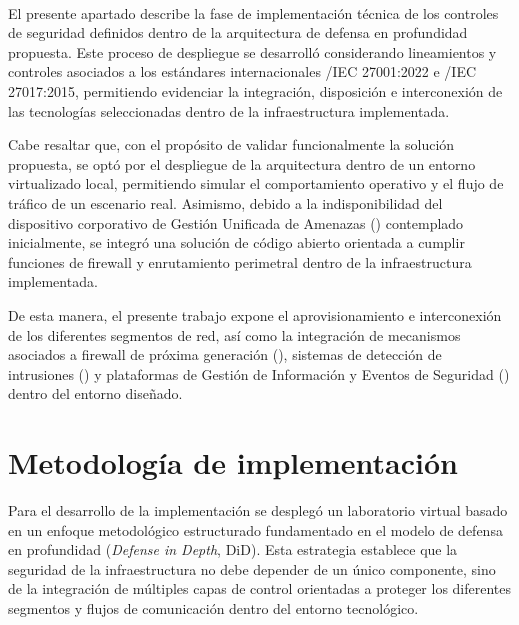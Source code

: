 \label{cap:pmv}
\mbox{}\\

El presente apartado describe la fase de implementación técnica de los controles de seguridad definidos dentro de la arquitectura de 
defensa en profundidad propuesta. Este proceso de despliegue se desarrolló considerando lineamientos y controles asociados a los 
estándares internacionales \ISO/IEC 27001:2022 e \ISO/IEC 27017:2015, permitiendo evidenciar la integración, disposición e interconexión de 
las tecnologías seleccionadas dentro de la infraestructura implementada.


Cabe resaltar que, con el propósito de validar funcionalmente la solución propuesta, se optó por el despliegue de la arquitectura dentro 
de un entorno virtualizado local, permitiendo simular el comportamiento operativo y el flujo de tráfico de un escenario real. Asimismo, 
debido a la indisponibilidad del dispositivo corporativo de Gestión Unificada de Amenazas (\UTM) contemplado inicialmente, se integró una 
solución de código abierto orientada a cumplir funciones de firewall y enrutamiento perimetral dentro de la infraestructura implementada.

De esta manera, el presente trabajo expone el aprovisionamiento e interconexión de los diferentes segmentos de red, así como la 
integración de mecanismos asociados a firewall de próxima generación (\NGFW), sistemas de detección de intrusiones (\IDS) y plataformas de 
Gestión de Información y Eventos de Seguridad (\SIEM) dentro del entorno diseñado.


\section{Metodología de implementación}

Para el desarrollo de la implementación se desplegó un laboratorio virtual basado en un enfoque metodológico estructurado fundamentado en 
el modelo de defensa en profundidad (\textit{Defense in Depth}, DiD). Esta estrategia establece que la seguridad de la infraestructura no 
debe depender de un único componente, sino de la integración de múltiples capas de control orientadas a proteger los diferentes segmentos 
y flujos de comunicación dentro del entorno tecnológico.

